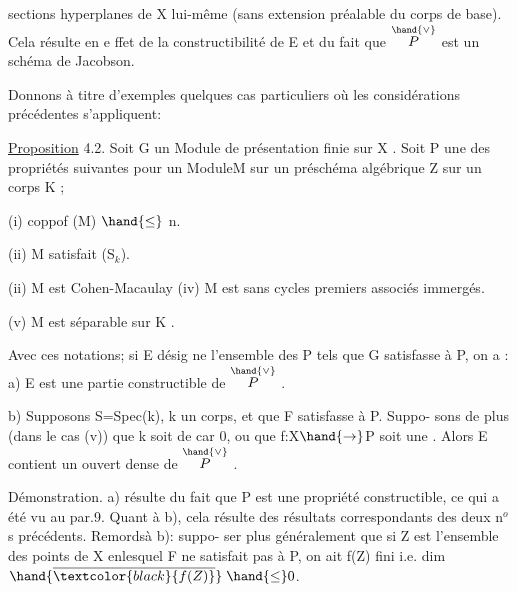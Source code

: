 
sections hyperplanes de X lui-même (sans extension préalable du corps
\placedmargin{$\hand{\rightarrow}$}de base). Cela résulte en e ffet de la constructibilité de E et du fait
que $\overset{\hand{\vee}}{P}$ est un schéma de Jacobson.

Donnons à titre d'exemples quelques cas particuliers où les
considérations précédentes s'appliquent:

\uline{Proposition} 4.2. Soit G un Module de présentation finie sur X .
Soit P une des propriétés suivantes pour un ModuleM sur un préschéma
algébrique Z sur un corps K ;


(i) coppof (M) $\hand{\leq}$ n.

(ii) M satisfait (S$_{k}$).

(i\unsure{}i) M est Cohen-Macaulay
(iv) M est sans cycles premiers associés immergés.

(v) M est séparable sur  K .



 Avec ces notations; si E désig%
ne l'ensemble des \hand{$\xi\in$} P tels que G\hand{$_{\xi}$} satisfasse à P, on a :
a) E est une partie constructible de $\overset{\hand{\vee}}{P}$ .

b) Supposons S=Spec(k), k un corps, et que F satisfasse à P. Suppo-%
sons de plus (dans le cas (v)) que k soit de car 0, ou que f:X$\hand{\rightarrow}$P soit une . 
Alors E contient un ouvert dense de $\overset{\hand{\vee}}{P}$ .

Démonstration. a) résulte du fait que P est une propriété
constructible, ce qui a été vu au par.9. Quant à b), cela résulte
des résultats correspondants des deux n$^{o}$s précédents. Remordsà b): suppo-%
ser plus généralement que si Z est l'ensemble des points de X enlesquel%
F ne satisfait pas à P, on ait f(Z) fini i.e. dim $\hand{\overline{\textcolor{black}{f(Z)}}}\;\hand{\leq}0$.


